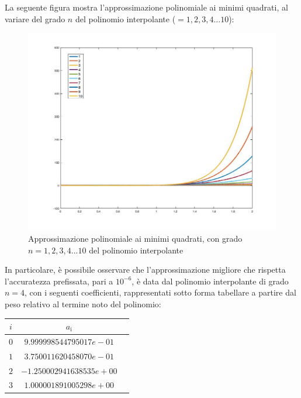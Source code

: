 La seguente figura mostra l'approssimazione polinomiale ai minimi quadrati, al variare del grado $n$ del polinomio interpolante ($=1,2,3,4...10$):
\begin{figure}[H]
	\includegraphics[width=\textwidth]{Chapter-4/Exercise-21/plot.jpg}
	\caption*{Approssimazione polinomiale ai minimi quadrati, con grado $n=1,2,3,4...10$ del polinomio interpolante}
\end{figure}

In particolare, è possibile osservare che l'approssimazione migliore che rispetta l'accuratezza prefissata, pari a $10^{-6}$, è data dal polinomio interpolante di grado $n = 4$, con i seguenti coefficienti,
rappresentati sotto forma tabellare a partire dal peso relativo al termine noto del polinomio:
\begin{table}[H]
	\centering
	\begin{tabular}{|c|c|c|}
		\hline
		$i$ & $a_\mathrm{i}$ \\
		\hline
		$0$ & $9.999998544795017e-01$ \\
		$1$ & $3.750011620458070e-01$ \\
		$2$ & $-1.250002941638535e+00$ \\
		$3$ & $1.000001891005298e+00$ \\
		\hline
	\end{tabular}
\end{table}
